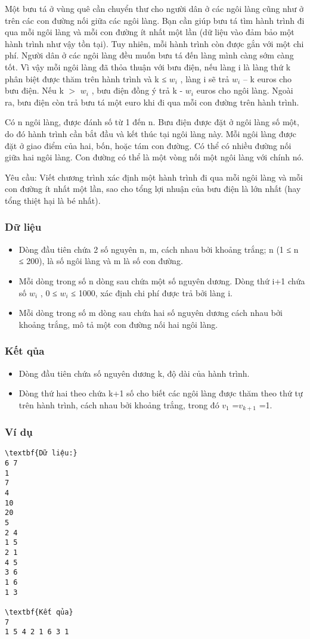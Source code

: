 



   Một bưu tá ở vùng quê cần chuyển thư cho người dân ở các ngôi làng cũng như ở trên các con đường nối giữa các ngôi làng. Bạn cần giúp bưu tá tìm hành trình đi qua mỗi ngôi làng và mỗi con đường ít   nhất một lần (dữ liệu vào đảm bảo một hành trình như vậy tồn tại). Tuy nhiên, mỗi hành trình còn được gắn với một chi phí. Người dân ở các ngôi làng đều muốn bưu tá đến làng mình càng sớm càng tốt. Vì vậy   mỗi ngôi làng đã thỏa thuận với bưu điện, nếu làng i là làng thứ k phân biệt được thăm trên hành trình và k ≤ $w_{i}$   , làng i sẽ trả $w_{i}$   – k euros cho bưu điện. Nếu k $>$ $w_{i}$   ,   bưu điện đồng ý trả k - $w_{i}$   euros cho ngôi làng. Ngoài ra, bưu điện còn trả bưu tá một euro khi đi qua mỗi con đường trên hành trình.  

   Có n ngôi làng, được đánh số từ 1 đến n. Bưu điện được đặt ở ngôi làng số một, do đó hành trình cần bắt đầu và kết thúc tại ngôi làng này. Mỗi ngôi làng được đặt ở giao điểm của hai, bốn, hoặc tám con   đường. Có thể có nhiều đường nối giữa hai ngôi làng. Con đường có thể là một vòng nối một ngôi làng với chính nó.  

   Yêu cầu: Viết chương trình xác định một hành trình đi qua mỗi ngôi làng và mỗi con đường ít nhất một lần, sao cho tổng lợi nhuận của bưu điện là lớn nhất (hay tổng thiệt hại là bé nhất).  

\subsubsection{   Dữ liệu  }
\begin{itemize}
	\item     Dòng đầu tiên chứa 2 số nguyên n, m, cách nhau bởi khoảng trắng; n (1 ≤ n ≤ 200), là số ngôi làng và m là số con đường.   
	\item     Mỗi dòng trong số n dòng sau chứa một số nguyên dương. Dòng thứ i+1 chứa số $w_{i}$    , 0  ≤  $w_{i}$    ≤ 1000, xác định chi phí được trả bởi làng i.   
	\item     Mỗi dòng trong số m dòng sau chứa hai số nguyên dương cách nhau bởi khoảng trắng, mô tả một con đường nối hai ngôi làng.   
\end{itemize}

\subsubsection{   Kết qủa  }
\begin{itemize}
	\item     Dòng đầu tiên chứa số nguyên dương k, độ dài của hành trình.   
	\item     Dòng thứ hai theo chứa k+1 số cho biết các ngôi làng được thăm theo thứ tự trên hành trình, cách nhau bởi khoảng trắng, trong đó $v_{1}$    =$v_{k+1}$    =1.   
\end{itemize}

\subsubsection{   Ví dụ  }
\begin{verbatim}
\textbf{Dữ liệu:}
6 7
1
7
4
10
20
5
2 4
1 5
2 1
4 5
3 6
1 6
1 3

\textbf{Kết qủa}
7
1 5 4 2 1 6 3 1
\end{verbatim}
